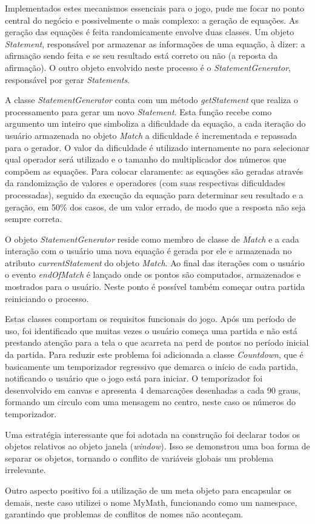 Implementados estes mecanismos essenciais para o jogo, pude me
focar no ponto central do negócio e possivelmente o mais complexo:
a geração de equações. As geração das equações é feita
randomicamente envolve duas classes. Um objeto \textit{Statement},
responsável por armazenar as informações de uma equação, à dizer:
a afirmação sendo feita e se seu resultado está correto ou não (a
reposta da afirmação). O outro objeto envolvido neste processo é o
\textit{StatementGenerator}, responsável por gerar \textit{Statements}.

A classe \textit{StatementGenerator} conta com um método
\textit{getStatement} que realiza o processamento para gerar um
novo \textit{Statement}. Esta função recebe como argumento um
inteiro que simboliza a dificuldade da equação, a cada iteração
do usuário armazenada no objeto \textit{Match} a dificuldade é
incrementada e repassada para o gerador. O valor da dificuldade
é utilizado internamente no para selecionar qual operador será
utilizado e o tamanho do multiplicador dos números que compõem
as equações. Para colocar claramente: as equações são geradas
através da randomização de valores e operadores (com suas respectivas
dificuldades processadas), seguido da execução da equação para
determinar seu resultado e a geração, em 50\% dos casos, de um valor
errado, de modo que a resposta não seja sempre correta.

O objeto \textit{StatementGenerator} reside como membro de classe de
\textit{Match} e a cada interação com o usuário uma nova equação
é gerada por ele e armazenada no atributo \textit{currentStatement}
do objeto \textit{Match}. Ao final das iterações com o usuário o
evento \textit{endOfMatch} é lançado onde os pontos são computados,
armazenados e mostrados para o usuário. Neste ponto é possível
também começar outra partida reiniciando o processo.

Estas classes comportam os requisitos funcionais do jogo. Após um
período de uso, foi identificado que muitas vezes o usuário começa
uma partida e não está prestando atenção para a tela o que acarreta
na perd de pontos no período inicial da partida. Para reduzir este
problema foi adicionada a classe \textit{Countdown}, que é basicamente
um temporizador regressivo que demarca o início de cada partida,
notificando o usuário que o jogo está para iniciar. O temporizador foi
desenvolvido em canvas e apresenta 4 demarcações desenhadas a cada 90
graus, formando um circulo com uma mensagem no centro, neste caso os
números do temporizador.

\begin{draft}
Uma estratégia interessante que foi adotada na construção foi
declarar todos os objetos relativos ao objeto janela (\textit{window}).
Isso se demonstrou uma boa forma de separar os objetos, tornando o
conflito de variáveis globais um problema irrelevante.

Outro aspecto positivo foi a utilização de um meta objeto para
encapsular os demais, neste caso utilizei o nome MyMath, funcionando
como um namespace, garantindo que problemas de conflitos de nomes não
aconteçam.
\end{draft}

